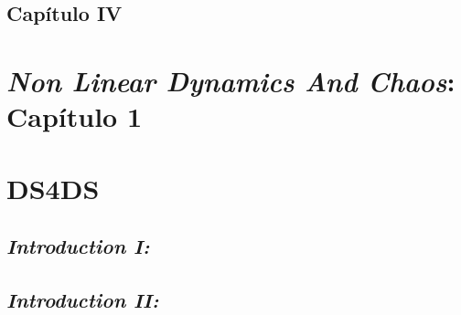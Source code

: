 \documentclass[12pt]{article}
\newcounter{subsubsubsection}[subsubsection]
\begin{document}



\subsection{Capítulo IV}

\section{\textit{Non Linear Dynamics And Chaos}: Capítulo 1}

\section{DS4DS}

\subsection{\textit{Introduction I:}}

\subsection{\textit{Introduction II:}}
\end{document}
